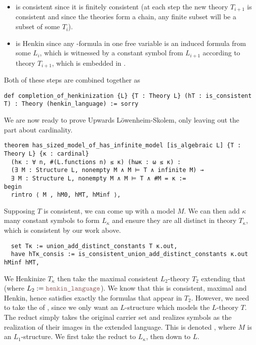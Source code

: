 \begin{itemize}
  \item
         is consistent since it is finitely consistent
        (at each step the new theory $T_{i+1}$ is consistent
        and since the theories form a chain,
        any finite subset will be a subset of some $T_{i}$).
  \item
         is Henkin since any -formula in one free variable
        is an induced formula from some $L_{i}$, which is witnessed by a constant symbol
        from $L_{i+1}$ according to theory $T_{i+1}$, which is embedded in .
\end{itemize}

Both of these steps are combined together as

\begin{lstlisting}
def completion_of_henkinization {L} {T : Theory L} (hT : is_consistent T) : Theory (henkin_language) := sorry
\end{lstlisting}

We are now ready to prove Upwards L\"{o}wenheim-Skolem,
only leaving out the part about cardinality.

\begin{lstlisting}
theorem has_sized_model_of_has_infinite_model [is_algebraic L] {T : Theory L} {κ : cardinal}
  (hκ : ∀ n, #(L.functions n) ≤ κ) (hωκ : ω ≤ κ) :
  (∃ M : Structure L, nonempty M ∧ M ⊨ T ∧ infinite M) →
  ∃ M : Structure L, nonempty M ∧ M ⊨ T ∧ #M = κ :=
begin
  rintro ⟨ M , hM0, hMT, hMinf ⟩, \end{lstlisting}

Supposing $T$ is consistent, we can come up with a model $M$.
We can then add $\kappa$ many constant symbols to form $L_\kappa$
and ensure they are all distinct in theory $T_\kappa$,
which is consistent by our work above.
\begin{lstlisting}
  set Tκ := union_add_distinct_constants T κ.out,
  have hTκ_consis := is_consistent_union_add_distinct_constants κ.out hMinf hMT, \end{lstlisting}
We Henkinize $T_\kappa$ then take the maximal consistent $L_{2}$-theory $T_{2}$
extending that (where $L_{2} := \code{henkin\_language}$).
We know that this is consistent, maximal and Henkin,
hence  satisfies exactly the formulas
that appear in $T_{2}$.
However, we need to take the  of ,
since we only want an $L$-structure which models the $L$-theory $T$.
The reduct simply takes the original carrier set and realizes symbols
as the realization of their images in the extended language.
This is denoted , where $M$ is
an $L_{1}$-structure.
We first take the reduct to $L_{\kappa}$, then down to $L$.

